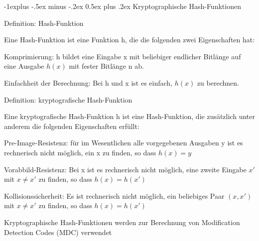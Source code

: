 \documentclass[a4paper]{article}
\makeatletter
\renewcommand{\subsection}{\@startsection{subsection}{2}{0mm}%
 {-1explus -.5ex minus -.2ex}%
 {0.5ex plus .2ex}%
 {\normalfont\normalsize\bfseries}}
\makeatother
\begin{document}
\begin{multicols}{3}
      \subsection{Kryptographische Hash-Funktionen}
      \begin{itemize*}
            \item Definition: Hash-Funktion
            \begin{itemize*}
                  \item Eine Hash-Funktion ist eine Funktion h, die die folgenden zwei Eigenschaften hat:
                  \begin{itemize*}
                        \item Komprimierung: h bildet eine Eingabe x mit beliebiger endlicher Bitlänge auf eine Ausgabe $h(x)$ mit fester Bitlänge n ab.
                        \item Einfachheit der Berechnung: Bei h und x ist es einfach, $h(x)$ zu berechnen.
                  \end{itemize*}
            \end{itemize*}
            \item Definition: kryptografische Hash-Funktion
            \begin{itemize*}
                  \item Eine kryptografische Hash-Funktion h ist eine Hash-Funktion, die zusätzlich unter anderem die folgenden Eigenschaften erfüllt:
                  \begin{itemize*}
                        \item Pre-Image-Resistenz: für im Wesentlichen alle vorgegebenen Ausgaben y ist es rechnerisch nicht möglich, ein x zu finden, so dass $h(x)=y$
                        \item Vorabbild-Resistenz: Bei x ist es rechnerisch nicht möglich, eine zweite Eingabe $x'$ mit $x\not= x'$ zu finden, so dass $h(x)=h(x')$
                        \item Kollisionssicherheit: Es ist rechnerisch nicht möglich, ein beliebiges Paar $(x,x')$ mit $x\not= x'$ zu finden, so dass $h(x)=h(x')$
                  \end{itemize*}
                  \item Kryptographische Hash-Funktionen werden zur Berechnung von Modification Detection Codes (MDC) verwendet
            \end{itemize*}
      \end{itemize*}


\end{multicols}
\end{document}
